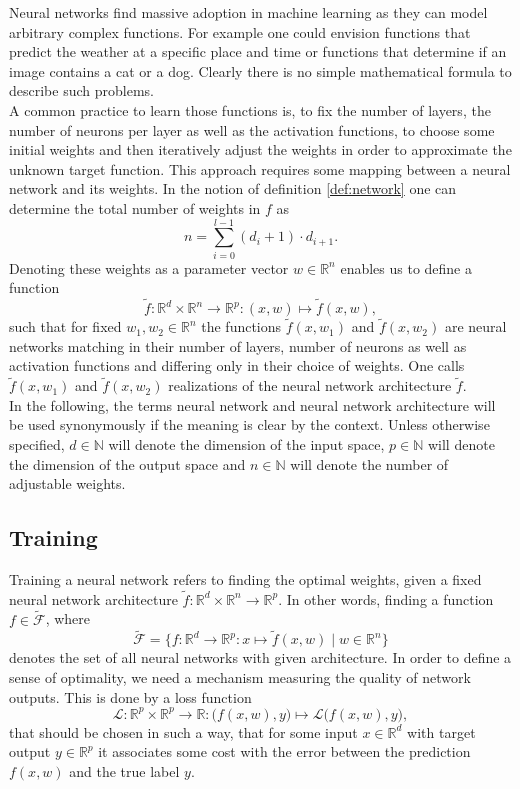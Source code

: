 \documentclass[11pt, a4paper]{article}
\newcommand{\N}{\mathds{N}}
\newcommand{\R}{\mathds{R}}
\newcommand{\F}{\mathcal{F}}
\renewcommand{\L}{\mathcal{L}}
\begin{document}
Neural networks find massive adoption in machine learning as they can model arbitrary complex functions. For example one could envision functions that predict the weather at a specific place and time or functions that determine if an image contains a cat or a dog. Clearly there is no simple mathematical formula to describe such problems. \\

A common practice to learn those functions is, to fix the number of layers, the number of neurons per layer as well as the activation functions, to choose some initial weights and then iteratively adjust the weights in order to approximate the unknown target function. This approach requires some mapping between a neural network and its weights. In the notion of definition \ref{def:network} one can determine the total number of weights in $f$ as
\[ n = \sum_{i=0}^{l-1} (d_i + 1) \cdot d_{i+1}. \]
Denoting these weights as a parameter vector $w \in \R^n$ enables us to define a function
\[ \tilde{f} : \R^d \times \R^n \to \R^p : (x,w) \mapsto \tilde{f}(x,w), \]
such that for fixed $w_1, w_2 \in \R^n$ the functions $\tilde{f}(x,w_1)$ and $\tilde{f}(x,w_2)$ are neural networks matching in their number of layers, number of neurons as well as activation functions and differing only in their choice of weights. One calls $\tilde{f}(x,w_1)$ and $\tilde{f}(x,w_2)$ realizations of the neural network architecture $\tilde{f}$. \\

In the following, the terms neural network and neural network architecture will be used synonymously if the meaning is clear by the context. Unless otherwise specified, $d \in \N$ will denote the dimension of the input space, $p \in \N$ will denote the dimension of the output space and $n \in \N$ will denote the number of adjustable weights.

\subsection{Training}\label{sec:Training}

Training a neural network refers to finding the optimal weights, given a fixed neural network architecture $\tilde{f} : \R^d \times \R^n \to \R^p$. In other words, finding a function $f \in \tilde{\F}$, where
\[ \tilde{\F} = \Big \{ f : \R^d \to \R^p : x \mapsto \tilde{f}(x,w) \mid w \in \R^n \Big \} \]
denotes the set of all neural networks with given architecture. In order to define a sense of optimality, we need a mechanism measuring the quality of network outputs. This is done by a loss function
\[ \L : \R^p \times \R^p \to \R : \big ( f(x,w),y \big ) \mapsto \L \big ( f(x,w),y \big ) ,\]
that should be chosen in such a way, that for some input $x \in \R^d$ with target output $y \in \R^p$ it associates some cost with the error between the prediction $f(x,w)$ and the true label $y$. \\
\end{document}
